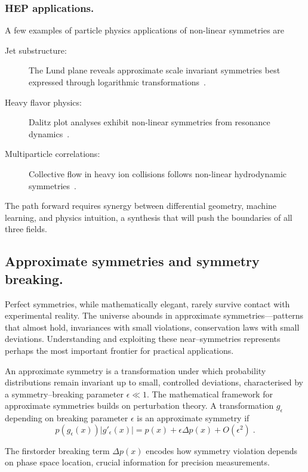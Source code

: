         \subsubsection{HEP applications.}
        A few examples of particle physics applications of non-linear symmetries are
        \begin{description}
            \item [Jet substructure:] The Lund plane reveals approximate scale invariant symmetries best expressed through logarithmic transformations~\cite{Dreyer:2018nbf}.
            \item [Heavy flavor physics:] Dalitz plot analyses exhibit non-linear symmetries from resonance dynamics~\cite{Asner:2003gh}.
            \item [Multiparticle correlations:] Collective flow in heavy ion collisions follows non-linear hydrodynamic symmetries~\cite{Yan:2015lwn}.
        \end{description}
        
        The path forward requires synergy between differential geometry, machine learning, and physics intuition, a synthesis that will push the boundaries of all three fields.
    
    \subsection{Approximate symmetries and symmetry breaking.}
        Perfect symmetries, while mathematically elegant, rarely survive contact with experimental reality.
        The universe abounds in approximate symmetries---patterns that almost hold, invariances with small violations, conservation laws with small deviations.
        Understanding and exploiting these near--symmetries represents perhaps the most important frontier for practical applications.
        
        An approximate symmetry is a transformation under which probability distributions remain invariant up to small, controlled deviations, characterised by a symmetry--breaking parameter \(\epsilon \ll 1\).
        The mathematical framework for approximate symmetries builds on perturbation theory.
        A transformation \(g_\epsilon\) depending on breaking parameter \(\epsilon\) is an approximate symmetry if
        \[
            p(g_\epsilon(x)) |g'_\epsilon(x)| = p(x) + \epsilon \Delta p(x) + O(\epsilon^2)\;.
        \]
        
        The firstorder breaking term \(\Delta p(x)\) encodes how symmetry violation depends on phase space location, crucial information for precision measurements.
    
